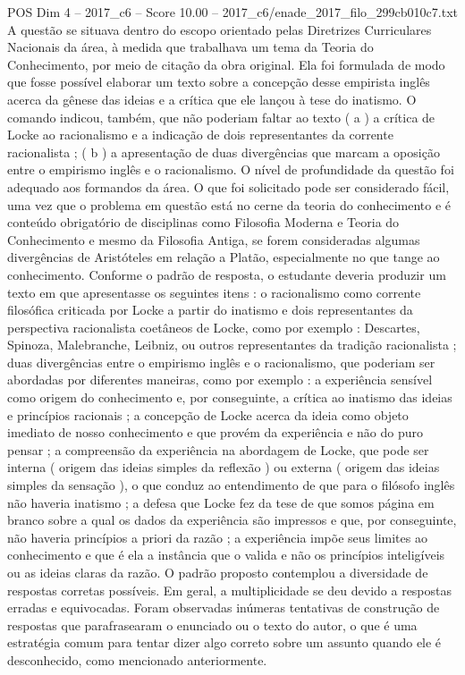 \begin{textsample}{POS Dim 4 – 2017\_c6 – Score 10.00 – 2017\_c6/enade\_2017\_filo\_299cb010c7.txt}
A questão se situava dentro do escopo orientado pelas Diretrizes Curriculares Nacionais da área, à medida que trabalhava um tema da Teoria do Conhecimento, por meio de citação da obra original.
Ela foi formulada de modo que fosse possível elaborar um texto sobre a concepção desse empirista inglês acerca da gênese das ideias e a crítica que ele lançou à tese do inatismo.
O comando indicou, também, que não poderiam faltar ao texto ( a ) a crítica de Locke ao racionalismo e a indicação de dois representantes da corrente racionalista ; ( b ) a apresentação de duas divergências que marcam a oposição entre o empirismo inglês e o racionalismo.
O nível de profundidade da questão foi adequado aos formandos da área.
O que foi solicitado pode ser considerado fácil, uma vez que o problema em questão está no cerne da teoria do conhecimento e é conteúdo obrigatório de disciplinas como Filosofia Moderna e Teoria do Conhecimento e mesmo da Filosofia Antiga, se forem consideradas algumas divergências de Aristóteles em relação a Platão, especialmente no que tange ao conhecimento.
Conforme o padrão de resposta, o estudante deveria produzir um texto em que apresentasse os seguintes itens : o racionalismo como corrente filosófica criticada por Locke a partir do inatismo e dois representantes da perspectiva racionalista coetâneos de Locke, como por exemplo : Descartes, Spinoza, Malebranche, Leibniz, ou outros representantes da tradição racionalista ; duas divergências entre o empirismo inglês e o racionalismo, que poderiam ser abordadas por diferentes maneiras, como por exemplo : a experiência sensível como origem do conhecimento e, por conseguinte, a crítica ao inatismo das ideias e princípios racionais ; a concepção de Locke acerca da ideia como objeto imediato de nosso conhecimento e que provém da experiência e não do puro pensar ; a compreensão da experiência na abordagem de Locke, que pode ser interna ( origem das ideias simples da reflexão ) ou externa ( origem das ideias simples da sensação ), o que conduz ao entendimento de que para o filósofo inglês não haveria inatismo ; a defesa que Locke fez da tese de que somos página em branco sobre a qual os dados da experiência são impressos e que, por conseguinte, não haveria princípios a priori da razão ; a experiência impõe seus limites ao conhecimento e que é ela a instância que o valida e não os princípios inteligíveis ou as ideias claras da razão.
O padrão proposto contemplou a diversidade de respostas corretas possíveis.
Em geral, a multiplicidade se deu devido a respostas erradas e equivocadas.
Foram observadas inúmeras tentativas de construção de respostas que parafrasearam o enunciado ou o texto do autor, o que é uma estratégia comum para tentar dizer algo correto sobre um assunto quando ele é desconhecido, como mencionado anteriormente.

\end{textsample}
